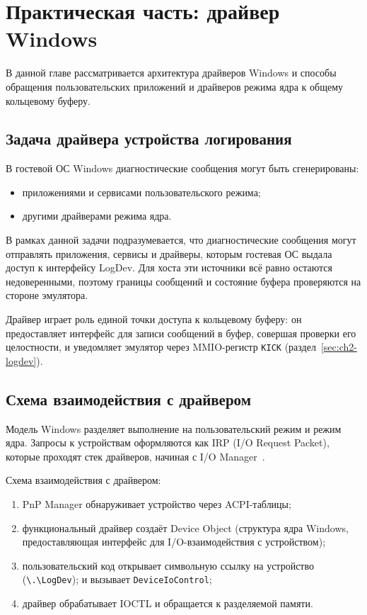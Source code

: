 \section{Практическая часть: драйвер Windows}
\label{sec:Chapter4} 

В данной главе рассматривается архитектура драйверов Windows и способы обращения
пользовательских приложений и драйверов режима ядра к общему кольцевому буферу.

\subsection{Задача драйвера устройства логирования}

В гостевой ОС Windows диагностические сообщения могут быть сгенерированы:
\begin{itemize}
    \item приложениями и сервисами пользовательского режима;
    \item другими драйверами режима ядра.
\end{itemize}

В рамках данной задачи подразумевается, что диагностические сообщения могут отправлять приложения, сервисы и драйверы, которым гостевая ОС выдала доступ к интерфейсу LogDev. Для хоста эти источники всё равно остаются недоверенными, поэтому границы сообщений и состояние буфера проверяются на стороне эмулятора.

Драйвер играет роль единой точки доступа к кольцевому буферу: он предоставляет интерфейс для записи сообщений в буфер, совершая проверки его целостности, и уведомляет эмулятор через MMIO-регистр \texttt{KICK} (раздел~\ref{sec:ch2-logdev}).

\subsection{Схема взаимодействия с драйвером}

Модель Windows разделяет выполнение на пользовательский режим и режим ядра.
Запросы к устройствам оформляются как IRP (I/O Request Packet), которые
проходят стек драйверов, начиная с I/O Manager~\cite{windows_wdk}.

Схема взаимодействия с драйвером:
\begin{enumerate}
    \item PnP Manager обнаруживает устройство через ACPI-таблицы;
    \item функциональный драйвер создаёт Device Object (структура ядра Windows, предоставляющая интерфейс для I/O-взаимодействия с устройством);
    \item пользовательский код открывает символьную ссылку на устройство\\
    (\texttt{\textbackslash{}.\textbackslash{}LogDev});
    и вызывает \texttt{DeviceIoControl};
    \item драйвер обрабатывает IOCTL и обращается к разделяемой памяти.
\end{enumerate}

